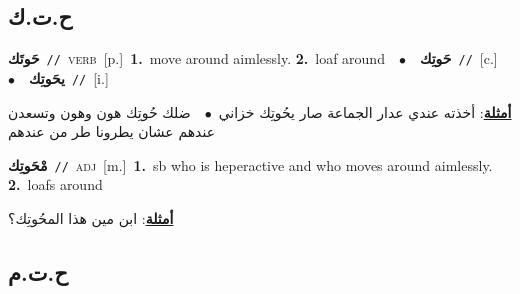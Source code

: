 \documentclass[10pt,a4paper,twoside]{article} %
\begin{document}
\begin{multicols}{2}
\vspace{-3mm}
\subsection*{\color{blue}\foreignlanguage{arabic}{ح.ت.ك}\color{blue}{}} 

{\setlength\topsep{0pt}\textbf{\foreignlanguage{arabic}{حَوتَك}}\ {\color{gray}\texttt{//}\color{black}}\ \textsc{verb}\ [p.]\ \textbf{1.}~move around aimlessly.  \textbf{2.}~loaf around\ \ $\bullet$\ \ \setlength\topsep{0pt}\textbf{\foreignlanguage{arabic}{حَوتِك}}\ {\color{gray}\texttt{//}\color{black}}\ [c.]\ \ $\bullet$\ \ \setlength\topsep{0pt}\textbf{\foreignlanguage{arabic}{يحَوتِك}}\ {\color{gray}\texttt{//}\color{black}}\ [i.]\  \begin{flushright}\color{gray}\foreignlanguage{arabic}{\textbf{\underline{\foreignlanguage{arabic}{أمثلة}}}: أخذته عندي عدار الجماعة صار يحُوتِك خزاني\ $\bullet$\ \  ضلك حُوتِك هون وهون وتسعدن عندهم عشان يطرونا طر من عندهم}\end{flushright}\color{black}} \vspace{2mm}

{\setlength\topsep{0pt}\textbf{\foreignlanguage{arabic}{مْحَوتِك}}\ {\color{gray}\texttt{//}\color{black}}\ \textsc{adj}\ [m.]\ \textbf{1.}~sb who is heperactive and who moves around aimlessly.  \textbf{2.}~loafs around\  \begin{flushright}\color{gray}\foreignlanguage{arabic}{\textbf{\underline{\foreignlanguage{arabic}{أمثلة}}}: ابن مين هذا المحُوتِك؟}\end{flushright}\color{black}} \vspace{2mm}

\vspace{-3mm}
\subsection*{\color{blue}\foreignlanguage{arabic}{ح.ت.م}\color{blue}{}} 


\end{multicols}
\end{document}
